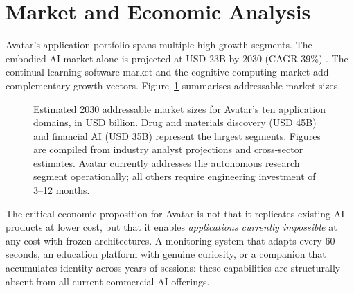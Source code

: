 \documentclass[12pt,a4paper]{article}
\begin{document}
\section{Market and Economic Analysis}

Avatar's application portfolio spans multiple high-growth segments. The embodied AI
market alone is projected at USD 23B by 2030 (CAGR 39\%) \cite{marketembodied2025}. The
continual learning software market and the cognitive computing market add complementary
growth vectors. Figure~\ref{fig:market} summarises addressable market sizes.

\begin{figure}[H]
\centering
{}
\caption{Estimated 2030 addressable market sizes for Avatar's ten application domains,
in USD billion. Drug and materials discovery (USD 45B) and financial AI (USD 35B) represent
the largest segments. Figures are compiled from industry analyst projections
\cite{marketembodied2025} and cross-sector estimates. Avatar currently addresses the
autonomous research segment operationally; all others require engineering investment of
3--12 months.}
\label{fig:market}
\end{figure}

The critical economic proposition for Avatar is not that it replicates existing AI
products at lower cost, but that it enables \emph{applications currently impossible} at
any cost with frozen architectures. A monitoring system that adapts every 60 seconds,
an education platform with genuine curiosity, or a companion that accumulates identity
across years of sessions: these capabilities are structurally absent from all current
commercial AI offerings.
\end{document}
